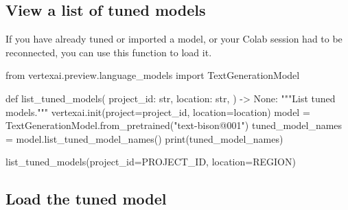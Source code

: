 \documentclass[
  letterpaper,
  DIV=11,
  numbers=noendperiod]{scrreprt}
\newenvironment{Shaded}{\begin{snugshade}}{\end{snugshade}}
\newcommand{\BuiltInTok}[1]{\textcolor[rgb]{0.00,0.23,0.31}{#1}}
\newcommand{\CommentTok}[1]{\textcolor[rgb]{0.37,0.37,0.37}{#1}}
\newcommand{\ImportTok}[1]{\textcolor[rgb]{0.00,0.46,0.62}{#1}}
\newcommand{\KeywordTok}[1]{\textcolor[rgb]{0.00,0.23,0.31}{#1}}
\newcommand{\NormalTok}[1]{\textcolor[rgb]{0.00,0.23,0.31}{#1}}
\newcommand{\OperatorTok}[1]{\textcolor[rgb]{0.37,0.37,0.37}{#1}}
\newcommand{\StringTok}[1]{\textcolor[rgb]{0.13,0.47,0.30}{#1}}
\newcommand{\VariableTok}[1]{\textcolor[rgb]{0.07,0.07,0.07}{#1}}
\begin{document}
\hypertarget{view-a-list-of-tuned-models}{%
\subsection{View a list of tuned
models}\label{view-a-list-of-tuned-models}}

If you have already tuned or imported a model, or your Colab session had
to be reconnected, you can use this function to load it.

\begin{Shaded}
\begin{Highlighting}[]
\ImportTok{from}\NormalTok{ vertexai.preview.language\_models }\ImportTok{import}\NormalTok{ TextGenerationModel}

\KeywordTok{def}\NormalTok{ list\_tuned\_models(}
\NormalTok{    project\_id: }\BuiltInTok{str}\NormalTok{,}
\NormalTok{    location: }\BuiltInTok{str}\NormalTok{,}
\NormalTok{) }\OperatorTok{{-}\textgreater{}} \VariableTok{None}\NormalTok{:}
    \CommentTok{"""List tuned models."""}
\NormalTok{    vertexai.init(project}\OperatorTok{=}\NormalTok{project\_id, location}\OperatorTok{=}\NormalTok{location)}
\NormalTok{    model }\OperatorTok{=}\NormalTok{ TextGenerationModel.from\_pretrained(}\StringTok{"text{-}bison@001"}\NormalTok{)}
\NormalTok{    tuned\_model\_names }\OperatorTok{=}\NormalTok{ model.list\_tuned\_model\_names()}
    \BuiltInTok{print}\NormalTok{(tuned\_model\_names)}
\end{Highlighting}
\end{Shaded}

\begin{Shaded}
\begin{Highlighting}[]
\NormalTok{list\_tuned\_models(project\_id}\OperatorTok{=}\NormalTok{PROJECT\_ID, location}\OperatorTok{=}\NormalTok{REGION)}
\end{Highlighting}
\end{Shaded}

\hypertarget{load-the-tuned-model}{%
\subsection{Load the tuned model}\label{load-the-tuned-model}}
\end{document}
